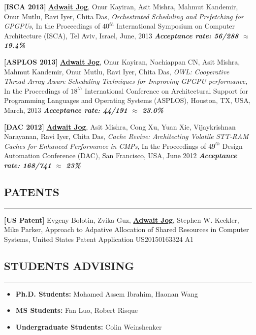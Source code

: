 \documentclass[10pt,a4]{article}
\begin{document}
\begin{description}
\item{\bf [ISCA 2013]}
{\bf \underline{Adwait Jog}}, Onur Kayiran, Asit Mishra, Mahmut Kandemir, Onur Mutlu, Ravi Iyer, Chita Das, 
{\it Orchestrated Scheduling and Prefetching for GPGPUs}, 
In the Proceedings of $40^{th}$ International Symposium on Computer Architecture (ISCA), Tel Aviv, Israel, June, 2013
\textbf{\textit{Acceptance rate: 56/288 $\approx$ 19.4\%}}

\item{\bf [ASPLOS 2013]} 
{\bf \underline{Adwait Jog}}, Onur Kayiran, Nachiappan CN, Asit Mishra, Mahmut Kandemir, Onur Mutlu, Ravi Iyer, Chita Das, 
{\it OWL: Cooperative Thread Array Aware Scheduling Techniques for Improving GPGPU performance},
In the Proceedings of $18^{th}$ International Conference on Architectural Support for Programming Languages and Operating Systems (ASPLOS), Houston, TX, USA, March, 2013 
\textbf{\textit{Acceptance rate: 44/191 $\approx$ 23.0\%}}

\item{\bf [DAC 2012]}
{\bf \underline{Adwait Jog}}, Asit Mishra, Cong Xu, Yuan Xie, Vijaykrishnan Narayanan, 
Ravi Iyer, Chita Das, {\it Cache Revive: Architecting Volatile STT-RAM Caches for Enhanced 
Performance in CMPs}, 
In the Proceedings of $49^{th}$ Design Automation Conference (DAC), San Francisco, USA, June 2012
\textbf{\textit{Acceptance rate: 168/741 $\approx$ 23\%}}

\end{description}

\subsection*{PATENTS}
\hrule
\vspace{0.2cm}

\begin{description}
\item{\bf [US Patent]}
Evgeny Bolotin, Zvika Guz, {\bf \underline{Adwait Jog}}, Stephen W. Keckler, Mike Parker, 
Approach to Adpative Allocation of Shared Resources in Computer Systems, 
United States Patent Application US20150163324 A1 

\end{description}

\subsection*{STUDENTS ADVISING}
\hrule
\vspace{0.2cm}
\begin{itemize}
\item {\bf Ph.D. Students:} Mohamed Assem Ibrahim, Haonan Wang
\item {\bf MS Students:}  Fan Luo, Robert Risque
\item {\bf Undergraduate Students:}  Colin Weinshenker
\end{itemize}
\end{document}
